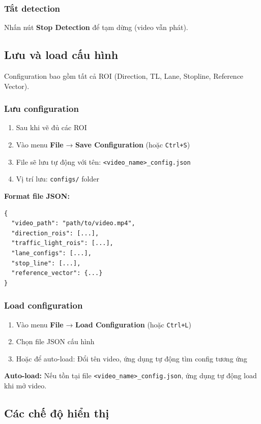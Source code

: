 \subsubsection{Tắt detection}
Nhấn nút \textbf{Stop Detection} để tạm dừng (video vẫn phát).

\subsection{Lưu và load cấu hình}

Configuration bao gồm tất cả ROI (Direction, TL, Lane, Stopline, Reference Vector).

\subsubsection{Lưu configuration}
\begin{enumerate}
    \item Sau khi vẽ đủ các ROI
    \item Vào menu \textbf{File} → \textbf{Save Configuration} (hoặc \texttt{Ctrl+S})
    \item File sẽ lưu tự động với tên: \texttt{<video\_name>\_config.json}
    \item Vị trí lưu: \texttt{configs/} folder
\end{enumerate}

\textbf{Format file JSON:}
\begin{verbatim}
{
  "video_path": "path/to/video.mp4",
  "direction_rois": [...],
  "traffic_light_rois": [...],
  "lane_configs": [...],
  "stop_line": [...],
  "reference_vector": {...}
}
\end{verbatim}

\subsubsection{Load configuration}
\begin{enumerate}
    \item Vào menu \textbf{File} → \textbf{Load Configuration} (hoặc \texttt{Ctrl+L})
    \item Chọn file JSON cấu hình
    \item Hoặc để auto-load: Đổi tên video, ứng dụng tự động tìm config tương ứng
\end{enumerate}

\textbf{Auto-load:} Nếu tồn tại file \texttt{<video\_name>\_config.json}, ứng dụng tự động load khi mở video.

\subsection{Các chế độ hiển thị}

